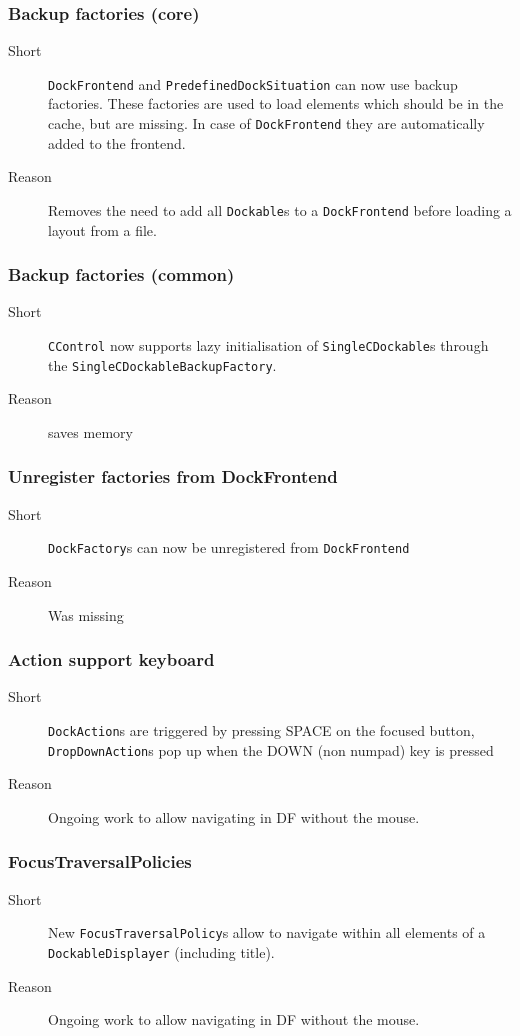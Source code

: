 \documentclass[a4paper,10pt]{article}
\newcommand{\src}[1]{\lstinline[basicstyle=\normalsize\ttfamily,keywordstyle=\normalsize\ttfamily,identifierstyle=\normalsize\ttfamily]|#1|}
\newcommand{\short}{\item[Short]}
\newcommand{\why}{\item[Reason]}
\begin{document}
\subsubsection{Backup factories (core)}
\begin{description}
 \short \src{DockFrontend} and \src{PredefinedDockSituation} can now use backup factories. These factories are used to load elements which should be in the cache, but are missing. In case of \src{DockFrontend} they are automatically added to the frontend.
 \why Removes the need to add all \src{Dockable}s to a \src{DockFrontend} before loading a layout from a file.
\end{description}

\subsubsection{Backup factories (common)}
\begin{description}
 \short \src{CControl} now supports lazy initialisation of \src{SingleCDockable}s through the \src{SingleCDockableBackupFactory}.
 \why saves memory
\end{description}

\subsubsection{Unregister factories from DockFrontend}
\begin{description}
 \short \src{DockFactory}s can now be unregistered from \src{DockFrontend}
 \why Was missing
\end{description}

\subsubsection{Action support keyboard}
\begin{description}
 \short \src{DockAction}s are triggered by pressing SPACE on the focused button, \src{DropDownAction}s pop up when the DOWN (non numpad) key is pressed
 \why Ongoing work to allow navigating in DF without the mouse.
\end{description}

\subsubsection{FocusTraversalPolicies}
\begin{description}
 \short New \src{FocusTraversalPolicy}s allow to navigate within all elements of a \src{DockableDisplayer} (including title).
 \why Ongoing work to allow navigating in DF without the mouse.
\end{description}
\end{document}
